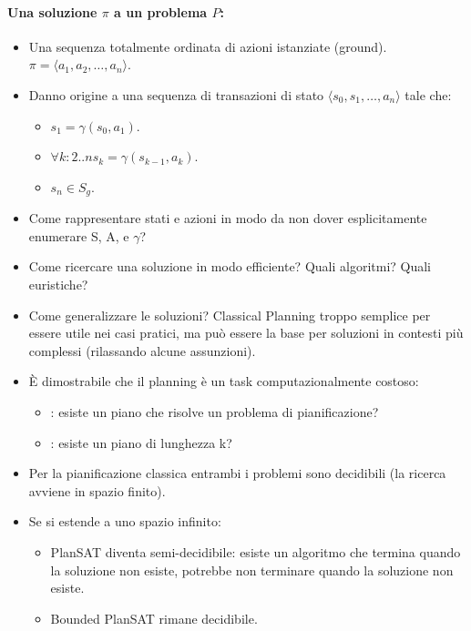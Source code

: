 \paragraph{Una soluzione $\pi$ a un problema $P$:}

\begin{itemize}
  \item Una sequenza totalmente ordinata di azioni istanziate (ground). $\pi = \langle a_1, a_2, \dots, a_n \rangle$.
  \item Danno origine a una sequenza di transazioni di stato  $\langle s_0, s_1, \dots, a_n \rangle$ tale che:
    \begin{itemize}
      \item $s_1 = \gamma(s_0, a_1)$. 
      \item $\forall k: 2..n s_k = \gamma(s_{k-1}, a_k)$. 
      \item $s_n \in S_g$.
    \end{itemize}
\end{itemize}


\begin{itemize}
  \item Come rappresentare stati e azioni in modo da non dover
esplicitamente enumerare S, A, e $\gamma$?
\item Come ricercare una soluzione in modo efficiente? Quali algoritmi? Quali euristiche?
\item Come generalizzare le soluzioni? Classical Planning troppo semplice per essere utile nei casi pratici, ma può essere la base per soluzioni in contesti più complessi (rilassando alcune assunzioni).
\end{itemize}


\begin{itemize}
  \item È dimostrabile che il planning è un task computazionalmente costoso:
    \begin{itemize}
      \item {}: esiste un piano che risolve un problema di pianificazione? 
      \item {}: esiste un piano di lunghezza k? 
    \end{itemize}
  \item Per la pianificazione classica entrambi i problemi sono decidibili (la
ricerca avviene in spazio finito). 
\item Se si estende a uno spazio infinito: 
  \begin{itemize}
    \item PlanSAT diventa semi-decidibile: esiste un algoritmo che termina quando la soluzione non esiste, potrebbe non terminare quando la soluzione non esiste.
    \item Bounded PlanSAT rimane decidibile.
  \end{itemize}
\end{itemize}

